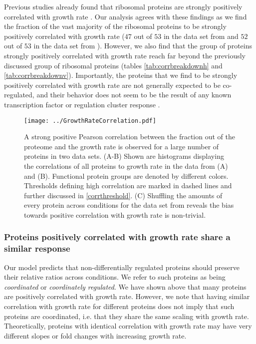 \documentclass{article}
\newcommand{\hRibs}{$53$}
\newcommand{\hCorrRibs}{$47$}
\newcommand{\vnRibs}{$53$}
\newcommand{\vRibs}{\vnRibs{}}
\newcommand{\vnCorrRibs}{$52$}
\newcommand{\vCorrRibs}{\vnCorrRibs{}}
\begin{document}
Previous studies already found that ribosomal proteins are strongly positively correlated with growth rate \cite{Pedersen1978a, ingraham1983growth, Klumpp2008}.
Our analysis agrees with these findings as we find the fraction of the vast majority of the ribosomal proteins to be strongly positively correlated with growth rate (\hCorrRibs{} out of \hRibs{} in the data set from \cite{Schmidt2015} and \vCorrRibs{} out of \vRibs{} in the data set from \cite{Peebo_2015}).
However, we also find that the group of proteins strongly positively correlated with growth rate reach far beyond the previously discussed group of ribosomal proteins (tables \ref{tab:corrbreakdownh} and \ref{tab:corrbreakdownv}).
Importantly, the proteins that we find to be strongly positively correlated with growth rate are not generally expected to be co-regulated, and their behavior does not seem to be the result of any known transcription factor or regulation cluster response \cite{23203884}.

\begin{figure}[H]
\begin{center}
\texttt{[image: ../GrowthRateCorrelation.pdf]}
\caption{\label{fig:growthcorr}
A strong positive Pearson correlation between the fraction out of the proteome and the growth rate is observed for a large number of proteins in two data sets.
(A-B) Shown are histograms displaying the correlations of all proteins to growth rate in the data from \cite{Schmidt2015} (A) and \cite{Peebo_2015} (B).
Functional protein groups are denoted by different colors.
Thresholds defining high correlation are marked in dashed lines and further discussed in \ref{corrthreshold}.
(C) Shuffling the amounts of every protein across conditions for the data set from \cite{Peebo_2015} reveals the bias towards positive correlation with growth rate is non-trivial.
%
}
\end{center}
\end{figure}

\subsubsection{Proteins positively correlated with growth rate share a similar response}
\label{propchange} 
Our model predicts that non-differentially regulated proteins should preserve their relative ratios across conditions.
We refer to such proteins as being \emph{coordinated} or \emph{coordinately regulated}.
We have shown above that many proteins are positively correlated with growth rate.
However, we note that having similar correlation with growth rate for different proteins does not imply that such proteins are coordinated, i.e. that they share the same scaling with growth rate.
Theoretically, proteins with identical correlation with growth rate may have very different slopes or fold changes with increasing growth rate.
\end{document}
